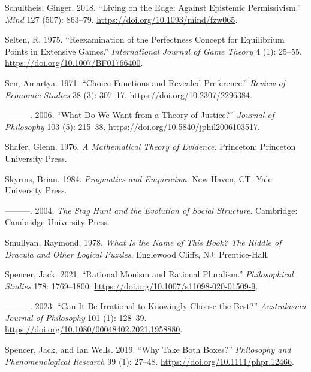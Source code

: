 \documentclass[
  12pt,
  letterpaper,
  DIV=11,
  numbers=noendperiod]{scrreprt}
\newlength{\cslhangindent}
\newlength{\cslentryspacingunit} %
\newenvironment{CSLReferences}[2] %
 {%
  \setlength{\parindent}{0pt}
  \ifodd #1
  \let\oldpar\par
  \def\par{\hangindent=\cslhangindent\oldpar}
  \fi
  \setlength{\parskip}{#2\cslentryspacingunit}
 }%
 {}
\begin{document}
\begin{CSLReferences}{1}{0}
\leavevmode{}%
Schultheis, Ginger. 2018. {``Living on the Edge: Against Epistemic
Permissivism.''} \emph{Mind} 127 (507): 863--79.
\url{https://doi.org/10.1093/mind/fzw065}.

\leavevmode{}%
Selten, R. 1975. {``Reexamination of the Perfectness Concept for
Equilibrium Points in Extensive Games.''} \emph{International Journal of
Game Theory} 4 (1): 25--55. \url{https://doi.org/10.1007/BF01766400}.

\leavevmode{}%
Sen, Amartya. 1971. {``Choice Functions and Revealed Preference.''}
\emph{Review of Economic Studies} 38 (3): 307--17.
\url{https://doi.org/10.2307/2296384}.

\leavevmode{}%
---------. 2006. {``What Do We Want from a Theory of Justice?''}
\emph{Journal of Philosophy} 103 (5): 215--38.
\url{https://doi.org/10.5840/jphil2006103517}.

\leavevmode{}%
Shafer, Glenn. 1976. \emph{A Mathematical Theory of Evidence}.
Princeton: Princeton University Press.

\leavevmode{}%
Skyrms, Brian. 1984. \emph{Pragmatics and Empiricism}. New Haven, CT:
Yale University Press.

\leavevmode{}%
---------. 2004. \emph{The Stag Hunt and the Evolution of Social
Structure}. Cambridge: {C}ambridge {U}niversity {P}ress.

\leavevmode{}%
Smullyan, Raymond. 1978. \emph{What Is the Name of This Book? The Riddle
of Dracula and Other Logical Puzzles}. Englewood Cliffs, NJ:
Prentice-Hall.

\leavevmode{}%
Spencer, Jack. 2021. {``Rational Monism and Rational Pluralism.''}
\emph{Philosophical Studies} 178: 1769--1800.
\url{https://doi.org/10.1007/s11098-020-01509-9}.

\leavevmode{}%
---------. 2023. {``Can It Be Irrational to Knowingly Choose the
Best?''} \emph{Australasian Journal of Philosophy} 101 (1): 128--39.
\url{https://doi.org/10.1080/00048402.2021.1958880}.

\leavevmode{}%
Spencer, Jack, and Ian Wells. 2019. {``Why Take Both Boxes?''}
\emph{{P}hilosophy and {P}henomenological {R}esearch} 99 (1): 27--48.
\url{https://doi.org/10.1111/phpr.12466}.


\end{CSLReferences}
\end{document}
